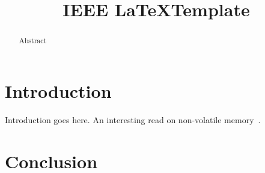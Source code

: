 \documentclass[conference]{IEEEtran}
\title{IEEE \LaTeX Template}
\begin{document}
\author{
}

\maketitle
\thispagestyle{plain}
\pagestyle{plain}

\begin{abstract}
    Abstract
\end{abstract}

\section{Introduction}
    Introduction goes here. An interesting read on non-volatile memory~\cite{inproceedings:pmemguide}.
\section{Conclusion}




\end{document}
